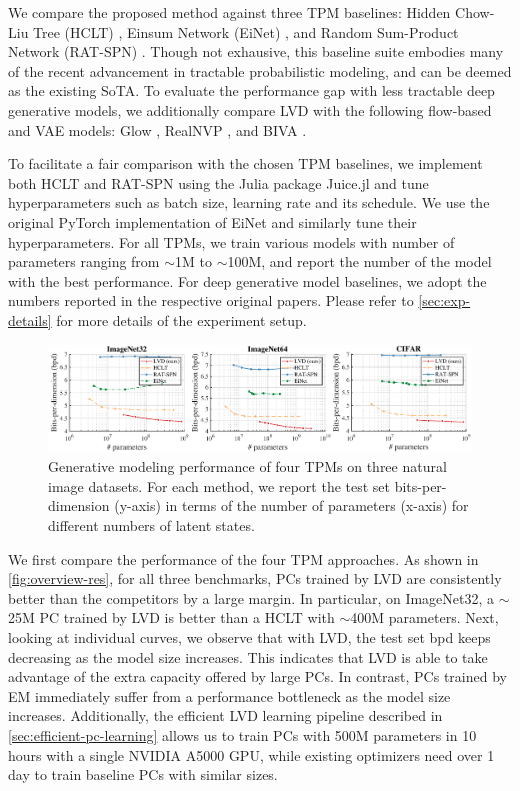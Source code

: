 \documentclass{article} %
\begin{document}
 We compare the proposed method against three TPM baselines: Hidden Chow-Liu Tree (HCLT) \citep{liu2021tractable}, Einsum Network (EiNet) \citep{peharz2020einsum}, and Random Sum-Product Network (RAT-SPN) \citep{peharz2020random}. Though not exhausive, this baseline suite embodies many of the recent advancement in tractable probabilistic modeling, and can be deemed as the existing SoTA. To evaluate the performance gap with less tractable deep generative models, we additionally compare LVD with the following flow-based and VAE models: Glow \citep{kingma2018glow}, RealNVP \citep{dinh2016density}, and BIVA \citep{maaloe2019biva}.

To facilitate a fair comparison with the chosen TPM baselines, we implement both HCLT and RAT-SPN using the Julia package Juice.jl \citep{dang2021juice} and tune hyperparameters such as batch size, learning rate and its schedule. We use the original PyTorch implementation of EiNet and similarly tune their hyperparameters. For all TPMs, we train various models with number of parameters ranging from $\sim$1M to $\sim$100M, and report the number of the model with the best performance. For deep generative model baselines, we adopt the numbers reported in the respective original papers. Please refer to \cref{sec:exp-details} for more details of the experiment setup.

\begin{figure}
    \centering
    \includegraphics[width=\columnwidth]{figures/fig-img-results.pdf}
    \vspace{-1.8em}
    \caption{Generative modeling performance of four TPMs on three natural image datasets. For each method, we report the test set bits-per-dimension (y-axis) in terms of the number of parameters (x-axis) for different numbers of latent states.}
    \label{fig:img-results}
\end{figure}

 We first compare the performance of the four TPM approaches. As shown in \cref{fig:overview-res}, for all three benchmarks, PCs trained by LVD are consistently better than the competitors by a large margin. In particular, on ImageNet32, a $\sim$25M PC trained by LVD is better than a HCLT with $\sim$400M parameters. Next, looking at individual curves, we observe that with LVD, the test set bpd keeps decreasing as the model size increases. This indicates that LVD is able to take advantage of the extra capacity offered by large PCs. In contrast, PCs trained by EM immediately suffer from a performance bottleneck as the model size increases. Additionally, the efficient LVD learning pipeline described in \cref{sec:efficient-pc-learning} allows us to train PCs with 500M parameters in 10 hours with a single NVIDIA A5000 GPU, while existing optimizers need over 1 day to train baseline PCs with similar sizes.
\end{document}
